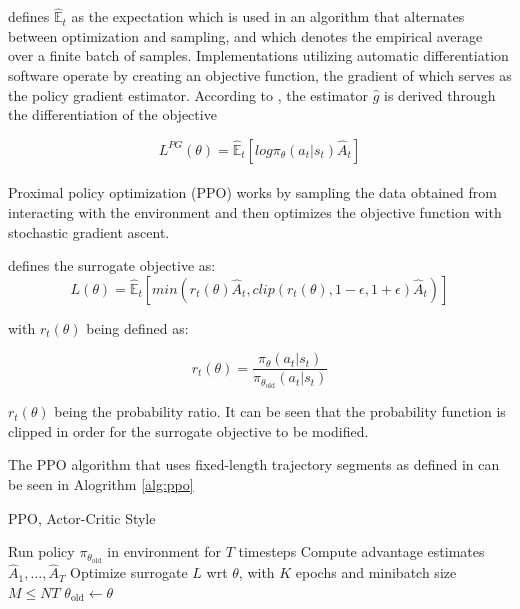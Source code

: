 \cite{schulman2017ppo} defines $\hat{\mathbb{E}}_{t}$ as the expectation which is used in an algorithm that alternates between optimization and sampling, and which denotes the empirical average over a finite batch of samples. Implementations utilizing automatic differentiation software operate by creating an objective function, the gradient of which serves as the policy gradient estimator. According to \cite{schulman2017ppo}, the estimator $\hat{g}$ is derived through the differentiation of the objective

\begin{equation}
    L^{PG} (\theta) = \hat{\mathbb{E}}_{t} [log \pi_{\theta}(a_t | s_t) \hat{A}_{t}]
\end{equation}

\paragraph{}
Proximal policy optimization (PPO) works by sampling the data obtained from interacting with the environment and then optimizes the objective function with stochastic gradient ascent.

\cite{shao2019survey} defines the surrogate objective as:
\begin{equation}
    L(\theta) = \hat{\mathbb{E}}_{t} [min(r_t(\theta) \hat{A}_{t}, clip(r_t(\theta), 1-\epsilon, 1+\epsilon) \hat{A}_{t})]
\end{equation}

with $r_t(\theta)$ being defined as:

\begin{equation}
    r_t(\theta) = \frac{\pi_{\theta} (a_t | s_t)}{\pi_{\theta_{\text{old}}} (a_t | s_t)}
\end{equation}

$r_t(\theta)$ being the probability ratio. It can be seen that the probability function is clipped in order for the surrogate objective to be modified.

The PPO algorithm that uses fixed-length trajectory segments as defined in \cite{schulman2017ppo} can be seen in Alogrithm \ref{alg:ppo}

\begin{algorithm}
    \caption{PPO, Actor-Critic Style}\label{alg:ppo}
    \begin{algorithmic}
            \State Run policy $\pi_{\theta_{\text{old}}}$ in environment for $T$ timesteps
            \State Compute advantage estimates $\hat{A}_{1}, \dots, \hat{A}_{T}$
        \EndFor
        \State Optimize surrogate $L$ wrt $\theta$, with $K$ epochs and minibatch size $M \leq NT$
        \State $\theta_{\text{old}} \gets \theta$
    \EndFor
    \end{algorithmic}
\end{algorithm}

